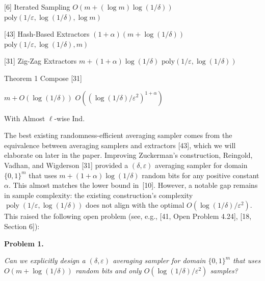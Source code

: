 \documentclass[10pt,a4paper]{article}
\begin{document}
[6] 
Iterated Sampling 
$O(m+(\log m)\log(1/\delta))$ 
$\text{poly}(1/\varepsilon,\log(1/\delta),\log m)$ 
\par


[43] 
Hash-Based Extractors 
$(1+\alpha)(m+\log(1/\delta))$ 
$\text{poly}(1/\varepsilon,\log(1/\delta),m)$ 
\par


[31] 
Zig-Zag Extractors 
$m+(1+\alpha)\log(1/\delta)$ 
$\text{poly}(1/\varepsilon,\log(1/\delta))$ 
\par


Theorem 1 
Compose [31]
 
$m+O(\log(1/\delta))$ 
$O((\log(1/\delta)/\varepsilon^{2})^{1+\alpha})$ 
\par


 
With Almost $\ell$-wise Ind. 
 
 
\par







The best existing randomness-efficient averaging sampler comes from the equivalence between averaging samplers and extractors [43], which we will elaborate on later in the paper. Improving Zuckerman’s construction, Reingold, Vadhan, and Wigderson [31] provided a $(\delta,\varepsilon)$ averaging sampler for domain $\{0,1\}^{m}$ that uses $m+(1+\alpha)\log(1/\delta)$ random bits for any positive constant $\alpha$. This almost matches the lower bound in [10]. However, a notable gap remains in sample complexity: the existing construction’s complexity $\operatorname*{poly}(1/\varepsilon,\log(1/\delta))$ does not align with the optimal $O(\log(1/\delta)/\varepsilon^{2})$. This raised the following open problem (see, e.g., [41, Open Problem 4.24], [18, Section 6]):\par





\par\medskip\noindent\textbf{
\textbf{Problem 1}\textbf{.}
}\par



\emph{Can we explicitly design a $(\delta,\varepsilon)$ averaging sampler for domain $\{0,1\}^{m}$ that uses $O(m+\log(1/\delta))$ random bits and only $O(\log(1/\delta)/\varepsilon^{2})$ samples?}\par
\end{document}
